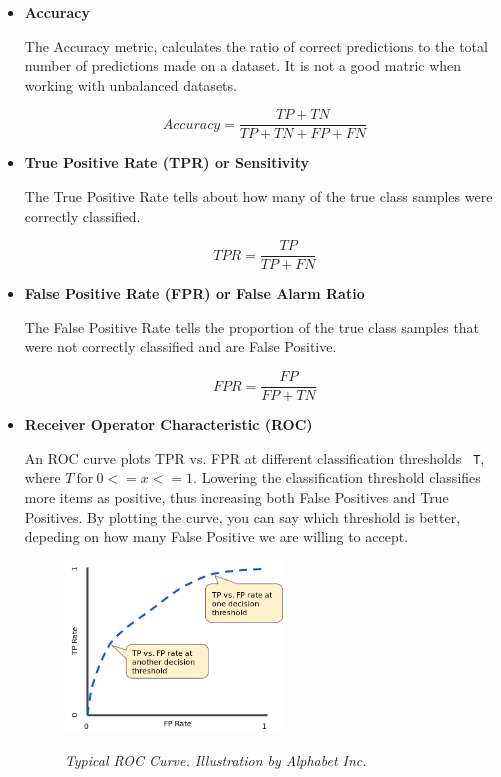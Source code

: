 \begin{itemize}

  \item {\bf Accuracy}

    The Accuracy metric, calculates the ratio of correct predictions to the total number of
    predictions made on a dataset. It is not a good matric when working with
    unbalanced datasets.

    \[Accuracy = \frac{TP + TN}{TP + TN + FP + FN}\]

  \item {\bf True Positive Rate (TPR) or Sensitivity}

    The True Positive Rate tells about how many of the true class samples were
    correctly classified.

    \[TPR = \frac{TP}{TP + FN}\]


  \item {\bf False Positive Rate (FPR) or False Alarm Ratio}

    The False Positive Rate tells the proportion of the true class samples that
    were not correctly classified and are False Positive.

    \[FPR = \frac{FP}{FP + TN}\]


  \item {\bf Receiver Operator Characteristic (ROC)}

	  An ROC curve plots TPR vs. FPR at different classification thresholds {\tt
	  T}, where $T \ \text{for} \ 0 <= x <= 1$. Lowering the classification
	  threshold classifies more items as positive, thus increasing both False
	  Positives and True Positives. By plotting the curve, you can say which
	  threshold is better, depeding on how many False Positive we are willing to
	  accept.

    \begin{figure}[H]
      \centering
      \begin{adjustbox}{trim={0pt 0cm 0pt 0cm}, clip}
        \centering
        \includegraphics[width=0.55\textwidth]{imatges/validation-strategy/ROCCurve.png}
      \end{adjustbox}
        \caption{\textit{Typical ROC Curve. Illustration by Alphabet Inc.}}
      {\label{fig:ROCCurve}}
    \end{figure}



\end{itemize}
